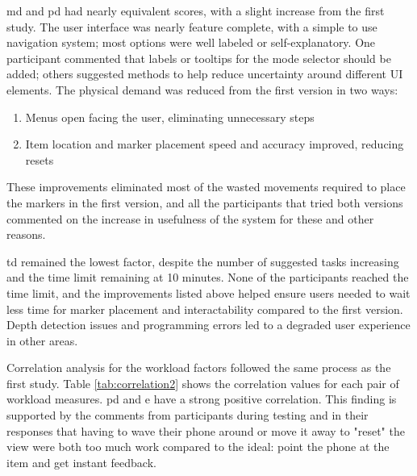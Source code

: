 \documentclass[thesis]{fputhesis}
\begin{document}
\begin{body}
\acrfull{md} and \acrfull{pd} had nearly equivalent scores, with a slight increase from the first study. The user interface was nearly feature complete, with a simple to use navigation system; most options were well labeled or self-explanatory. One participant commented that labels or tooltips for the mode selector should be added; others suggested methods to help reduce uncertainty around different UI elements. The physical demand was reduced from the first version in two ways:
\begin{enumerate}
    \item Menus open facing the user, eliminating unnecessary steps
    \item Item location and marker placement speed and accuracy improved, reducing resets
\end{enumerate}
These improvements eliminated most of the wasted movements required to place the markers in the first version, and all the participants that tried both versions commented on the increase in usefulness of the system for these and other reasons.

\acrfull{td} remained the lowest factor, despite the number of suggested tasks increasing and the time limit remaining at 10 minutes. None of the participants reached the time limit, and the improvements listed above helped ensure users needed to wait less time for marker placement and interactability compared to the first version. Depth detection issues and programming errors led to a degraded user experience in other areas.

Correlation analysis for the workload factors followed the same process as the first study. Table \ref{tab:correlation2} shows the correlation values for each pair of workload measures. \acrfull{pd} and \acrfull{e} have a strong positive correlation. This finding is supported by the comments from participants during testing and in their responses that having to wave their phone around or move it away to "reset" the view were both too much work compared to the ideal: point the phone at the item and get instant feedback.


\end{body}
\end{document}
